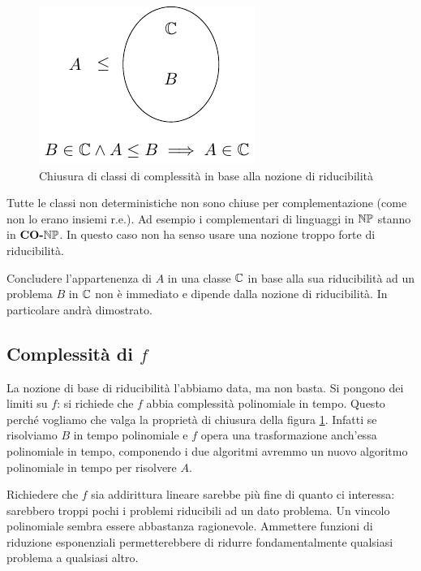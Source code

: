 \begin{figure}[h]
    \begin{center}
        \includegraphics{./img/complexity_intro/ReducibilityNotion.pdf}
    \end{center}
    \caption{Chiusura di classi di complessità in base alla nozione di riducibilità}
    \label{ReducibilityNotion}
\end{figure}

Tutte le classi non deterministiche non sono chiuse per complementazione (come non lo erano insiemi
r.e.). Ad esempio i complementari di linguaggi in $\mathbb{NP}$ stanno in $\textbf{CO-}\mathbb{NP}$. In questo caso
non ha senso usare una nozione troppo forte di riducibilità.

Concludere l'appartenenza di $A$ in una classe $\mathbb{C}$ in base alla sua riducibilità ad un
problema $B$ in $\mathbb{C}$ non è immediato e dipende dalla nozione di riducibilità. In particolare
andrà dimostrato.

\subsection{Complessità di $f$}

La nozione di base di riducibilità l'abbiamo data, ma non basta. Si pongono dei limiti su $f$: si
richiede che $f$ abbia complessità polinomiale in tempo. Questo perché vogliamo che valga la
proprietà di chiusura della figura \ref{ReducibilityNotion}. Infatti se risolviamo $B$ in tempo
polinomiale e $f$ opera una trasformazione anch'essa polinomiale in tempo, componendo i due
algoritmi avremmo un nuovo algoritmo polinomiale in tempo per risolvere $A$.

Richiedere che $f$ sia addirittura lineare sarebbe più fine di quanto ci interessa: sarebbero troppi
pochi i problemi riducibili ad un dato problema. Un vincolo polinomiale sembra essere abbastanza
ragionevole.  Ammettere funzioni di riduzione esponenziali permetterebbere di ridurre
fondamentalmente qualsiasi problema a qualsiasi altro.

